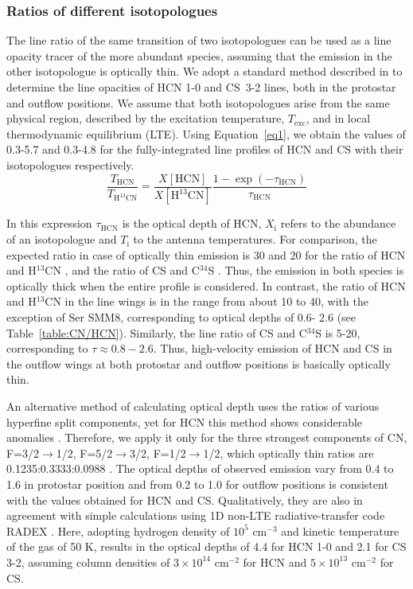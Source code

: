 \documentclass{aa}
\begin{document}
\subsubsection{Ratios of different isotopologues}
\label{subsection:isotopologues}

The line ratio of the same transition of two isotopologues can be used as a line opacity tracer 
of the more abundant species, assuming that the emission in the 
other isotopologue is optically thin. We adopt a standard method described in \cite{Gol84} 
to determine the line opacities of HCN 1-0 and \mbox{CS 3-2} lines, both in the protostar 
and outflow positions. We assume that both isotopologues arise from the 
same physical region, described by the excitation temperature, $T_\mathrm{exc}$, and 
in local thermodynamic equilibrium (LTE). Using Equation~\ref{eq1}, we obtain
the values of 0.3-5.7 and 0.3-4.8 for the fully-integrated line profiles of HCN and CS with their isotopologues respectively.
\begin{equation} 
\label{eq1} \frac{T_{\mathrm{HCN}}}{T_{\mathrm{H^{13}CN}}} =
\frac{X[\mathrm{HCN}]}{X[\mathrm{H^{13}CN}]} \frac
{1-\exp(-\tau_{\mathrm{HCN}})}{\tau_{\mathrm{HCN}}} 
\end{equation} 

In this expression $\tau_{\mathrm{HCN}}$ is the optical depth of HCN, $X_{\mathrm{i}}$ refers to the abundance of an isotopologue and $T_{\mathrm{i}}$ to the antenna temperatures. For comparison, the expected ratio in case of optically thin emission is 30 and 20 for the ratio of HCN and H$^{13}$CN \citep{Dan13}, and the ratio of CS and C$^{34}$S \citep{Ter10}. Thus,
the emission in both species is optically thick when the entire
profile is considered. In contrast, the ratio of HCN and H$^{13}$CN
in the line wings is in the range from about 10 to 40, with the
exception of Ser SMM8, corresponding to optical depths of 0.6-
2.6 (see Table~\ref{table:CN/HCN}). Similarly, the line ratio of CS and C$^{34}$S is 5-20,
corresponding to $\tau \approx 0.8-2.6$. Thus, high-velocity emission of
HCN and CS in the outflow wings at both protostar and outflow
positions is basically optically thin.

An alternative method of calculating optical depth
uses the ratios of various hyperfine split components, yet for HCN this method shows considerable anomalies
\citep{Lou12}. Therefore, we apply it only
for the three strongest components of CN, F=3/2$\rightarrow$1/2, F=5/2$\rightarrow$3/2, F=1/2$\rightarrow$1/2, which optically thin ratios are
0.1235:0.3333:0.0988 \citep{Ska83}. The optical
depths of observed emission vary from 0.4 to 1.6 in protostar
position and from 0.2 to 1.0 for outflow positions is consistent
with the values obtained for HCN and CS. Qualitatively,
they are also in agreement with simple calculations using 1D
non-LTE radiative-transfer code RADEX \citep{vdT07}. Here, adopting hydrogen density of $10^5$ cm$^{-3}$ and kinetic temperature of the gas of 50 K, results in the optical
depths of 4.4 for HCN 1-0 and 2.1 for CS 3-2, assuming column densities of $3 \times 10^{14}$ cm$^{-2}$ for HCN and $5 \times 10^{13}$ cm$^{-2}$ for
CS.
\end{document}
